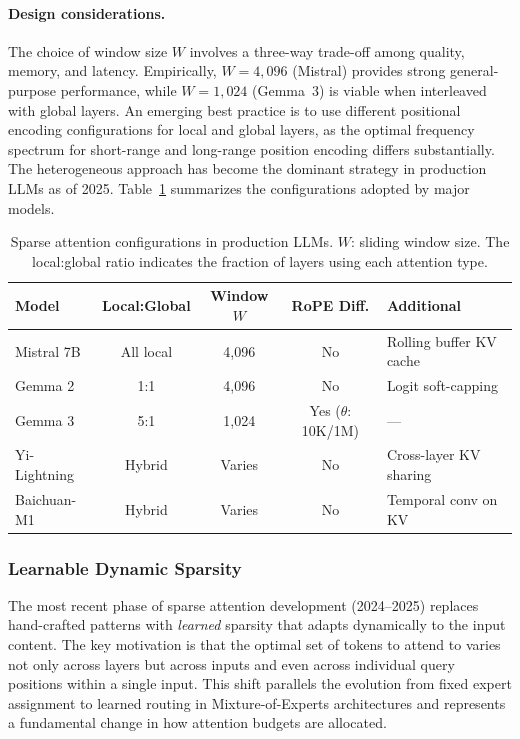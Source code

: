 \paragraph{Design considerations.}
The choice of window size $W$ involves a three-way trade-off among quality, memory, and latency. Empirically, $W = 4{,}096$ (Mistral) provides strong general-purpose performance, while $W = 1{,}024$ (Gemma~3) is viable when interleaved with global layers. An emerging best practice is to use different positional encoding configurations for local and global layers, as the optimal frequency spectrum for short-range and long-range position encoding differs substantially. The heterogeneous approach has become the dominant strategy in production LLMs as of 2025. Table~\ref{tab:sparse-production} summarizes the configurations adopted by major models.

\begin{table}[t]
\centering
\caption{Sparse attention configurations in production LLMs. $W$: sliding window size. The local:global ratio indicates the fraction of layers using each attention type.}
\label{tab:sparse-production}
\small
\begin{tabular}{lcccl}
\toprule
\textbf{Model} & \textbf{Local:Global} & \textbf{Window $W$} & \textbf{RoPE Diff.} & \textbf{Additional} \\
\midrule
Mistral 7B     & All local    & 4,096  & No  & Rolling buffer KV cache \\
Gemma 2        & 1:1          & 4,096  & No  & Logit soft-capping \\
Gemma 3        & 5:1          & 1,024  & Yes ($\theta$: 10K/1M) & --- \\
Yi-Lightning   & Hybrid       & Varies & No  & Cross-layer KV sharing \\
Baichuan-M1    & Hybrid       & Varies & No  & Temporal conv on KV \\
\bottomrule
\end{tabular}
\end{table}


\subsubsection{Learnable Dynamic Sparsity}
\label{subsubsec:learnable-sparse}

The most recent phase of sparse attention development (2024--2025) replaces hand-crafted patterns with \emph{learned} sparsity that adapts dynamically to the input content. The key motivation is that the optimal set of tokens to attend to varies not only across layers but across inputs and even across individual query positions within a single input. This shift parallels the evolution from fixed expert assignment to learned routing in Mixture-of-Experts architectures and represents a fundamental change in how attention budgets are allocated.

